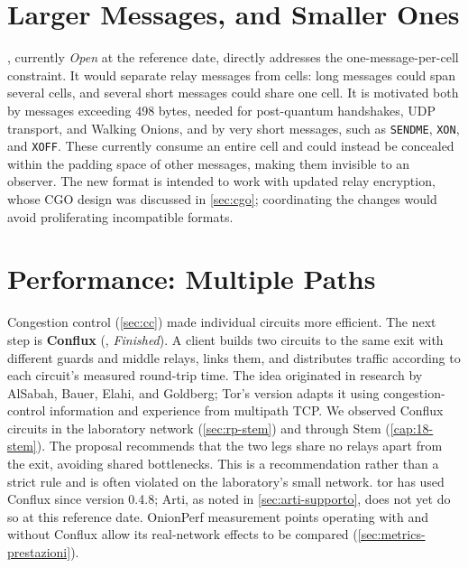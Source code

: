 \section{Larger Messages, and Smaller Ones}\label{sec:fut-340}

, currently \emph{Open} at the reference date, directly addresses the one-message-per-cell constraint. It would separate relay messages from cells: long messages could span several cells, and several short messages could share one cell. It is motivated both by messages exceeding 498 bytes, needed for post-quantum handshakes, UDP transport, and Walking Onions, and by very short messages, such as \texttt{SENDME}, \texttt{XON}, and \texttt{XOFF}. These currently consume an entire cell and could instead be concealed within the padding space of other messages, making them invisible to an observer. The new format is intended to work with updated relay encryption, whose CGO design was discussed in \cref{sec:cgo}; coordinating the changes would avoid proliferating incompatible formats.

\section{Performance: Multiple Paths}\label{sec:fut-conflux}

Congestion control (\cref{sec:cc}) made individual circuits more efficient. The next step is \textbf{Conflux} (, \emph{Finished}). A client builds two circuits to the same exit with different guards and middle relays, links them, and distributes traffic according to each circuit's measured round-trip time. The idea originated in research by AlSabah, Bauer, Elahi, and Goldberg; Tor's version adapts it using congestion-control information and experience from multipath TCP. We observed Conflux circuits in the laboratory network (\cref{sec:rp-stem}) and through Stem (\cref{cap:18-stem}). The proposal recommends that the two legs share no relays apart from the exit, avoiding shared bottlenecks. This is a recommendation rather than a strict rule and is often violated on the laboratory's small network. tor has used Conflux since version 0.4.8; Arti, as noted in \cref{sec:arti-supporto}, does not yet do so at this reference date. OnionPerf measurement points operating with and without Conflux allow its real-network effects to be compared (\cref{sec:metrics-prestazioni}).

